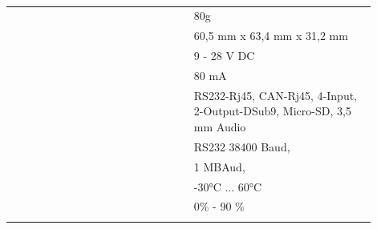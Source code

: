 \section{}
\begin{table}[H]
	\begin{tabular}{L{0.45\linewidth} L{0.45\linewidth}}
		\toprule
         & 80g \\
         & 60,5 mm x 63,4 mm x 31,2 mm \\
         & 9 - 28 V DC \\
         & 80 mA \\
         & RS232-Rj45, CAN-Rj45, 4-Input, 2-Output-DSub9, Micro-SD, 3,5 mm Audio \\
         & RS232 38400 Baud, \href{https://github.com/larus-breeze/doc_larus/blob/master/documentation/Larus_NMEA_Protocol.md}{} \\
         & 1 MBAud, \href{https://github.com/larus-breeze/doc_larus/blob/master/documentation/can_spec.md}{}\\
         & -30°C ... 60°C \\
         & 0\% - 90 \% \\
         &  \\
		\bottomrule
	\end{tabular}
	\caption{}
\end{table}

\newpage